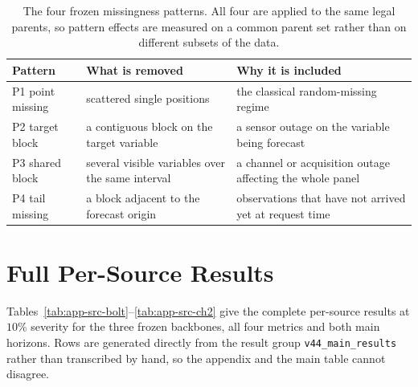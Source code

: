 \documentclass{article}
\begin{document}
\begin{table}[h]
  \caption{The four frozen missingness patterns. All four are applied to the same legal
  parents, so pattern effects are measured on a common parent set rather than on different
  subsets of the data.}
  \label{tab:app-patterns}
  \centering
  \small
  \setlength{\tabcolsep}{4pt}
\begin{tabular}{@{}l p{} p{}@{}}
    \toprule
    Pattern & What is removed & Why it is included \\
    \midrule
    P1 point missing    & scattered single positions & the classical random-missing regime \\
    P2 target block     & a contiguous block on the target variable & a sensor outage on the variable being forecast \\
    P3 shared block     & several visible variables over the same interval & a channel or acquisition outage affecting the whole panel \\
    P4 tail missing     & a block adjacent to the forecast origin & observations that have not arrived yet at request time \\
    \bottomrule
  \end{tabular}
\end{table}

\section{Full Per-Source Results}
\label{app:datasets}
Tables~\ref{tab:app-src-bolt}--\ref{tab:app-src-ch2} give the complete per-source results at
$10\%$ severity for the three frozen backbones, all four metrics and both main horizons.
Rows are generated directly from the result group \texttt{v44\_main\_results} rather than
transcribed by hand, so the appendix and the main table cannot disagree.
\end{document}
